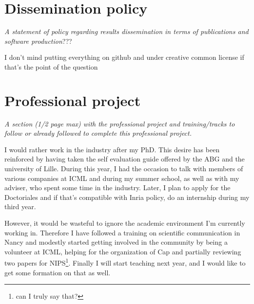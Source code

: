 \section{Dissemination policy}\label{dissemination-policy}

\emph{A statement of policy regarding results dissemination in terms of
publications and software production}???

I don't mind putting everything on github and under creative common
license if that's the point of the question

\section{Professional project}\label{professional-project}

\emph{A section (1/2 page max) with the professional project and
training/tracks to follow or already followed to complete this
professional project.}

I would rather work in the industry after my PhD. This desire has been
reinforced by having taken the self evaluation guide offered by the ABG
and the university of Lille. During this year, I had the occasion to
talk with members of various companies at ICML and during my summer
school, as well as with my adviser, who spent some time in the industry.
Later, I plan to apply for the Doctoriales and if that's compatible with
Inria policy, do an internship during my third year.

However, it would be wasteful to ignore the academic environment I'm currently
working in. Therefore I have followed a training on scientific communication in
Nancy and modestly started getting involved in the community by being a
volunteer at ICML, helping for the organization of Cap and partially reviewing
two papers for NIPS\footnote{can I truly say that?}. Finally I will start
teaching next year, and I would like to get some formation on that as well.
